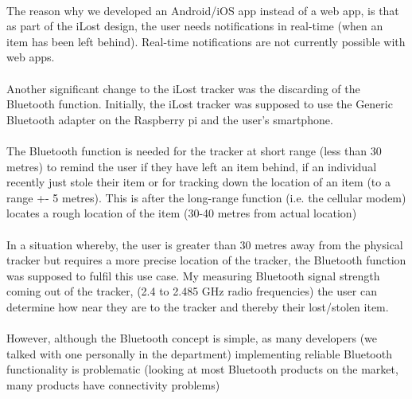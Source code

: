 \documentclass[12pt,a4paper]{article}
\begin{document}
        \paragraph{} The reason why we developed an Android/iOS app instead of a web app, is that as part of the iLost design, the user needs notifications in real-time (when an item has been left behind). Real-time notifications are not currently possible with web apps.
        
        \paragraph{} Another significant change to the iLost tracker was the discarding of the Bluetooth function. Initially, the iLost tracker was supposed to use the Generic Bluetooth adapter on the Raspberry pi and the user’s smartphone.  
        
        \paragraph{} The Bluetooth function is needed for the tracker at short range (less than 30 metres) to remind the user if they have left an item behind, if an individual recently just stole their item or for tracking down the location of an item (to a range +- 5 metres). This is after the long-range function (i.e. the cellular modem) locates a rough location of the item (30-40 metres from actual location)
        
        \paragraph{} In a situation whereby, the user is greater than 30 metres away from the physical tracker but requires a more precise location of the tracker, the Bluetooth function was supposed to fulfil this use case. My measuring Bluetooth signal strength coming out of the tracker, (2.4 to 2.485 GHz radio frequencies) the user can determine how near they are to the tracker and thereby their lost/stolen item. 
        
        \paragraph{} However, although the Bluetooth concept is simple, as many developers (we talked with one personally in the department) implementing reliable Bluetooth functionality is problematic (looking at most Bluetooth products on the market, many products have connectivity problems)  
        
\end{document}
